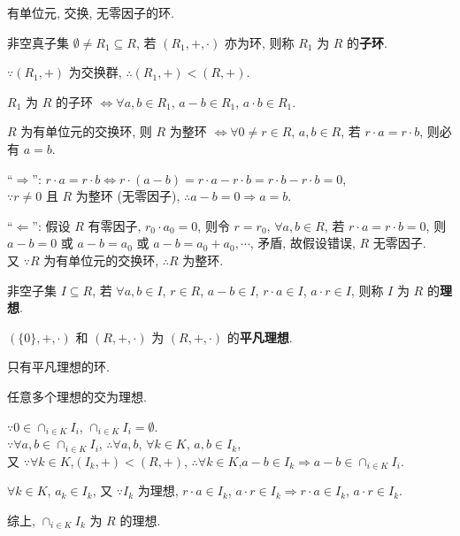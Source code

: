 \documentclass{note}
\begin{document}
\begin{df}[整环]
    有单位元, 交换, 无零因子的环.
\end{df}

\begin{df}[子环]
    非空真子集 $\emptyset\neq R_1\subseteq R$, 若 $(R_1,+,\cdot)$ 亦为环, 则称 $R_1$ 为 $R$ 的\textbf{子环}.
\end{df}

$\because(R_1,+)$ 为交换群, $\therefore(R_1,+)<(R,+)$.

\begin{thm}[子环的判定]
    $R_1$ 为 $R$ 的子环 $\Longleftrightarrow\forall a,b\in R_1$, $a-b\in R_1$, $a\cdot b\in R_1$.
\end{thm}

\begin{thm}
    $R$ 为有单位元的交换环, 则 $R$ 为整环 $\Longleftrightarrow\forall 0\neq r\in R$, $a,b\in R$, 若 $r\cdot a=r\cdot b$, 则必有 $a=b$.
\end{thm}
\begin{pf}
    ``$\Longrightarrow$'': $r\cdot a=r\cdot b\Longleftrightarrow r\cdot(a-b)=r\cdot a-r\cdot b=r\cdot b-r\cdot b=0$,\\
    $\because r\neq 0$ 且 $R$ 为整环 (无零因子), $\therefore a-b=0\Longrightarrow a=b$.

    ``$\Longleftarrow$'': 假设 $R$ 有零因子, $r_0\cdot a_0=0$, 则令 $r=r_0$, $\forall a,b\in R$, 若 $r\cdot a=r\cdot b=0$, 则 $a-b=0$ 或 $a-b=a_0$ 或 $a-b=a_0+a_0,\cdots$, 矛盾, 故假设错误, $R$ 无零因子.\\
    又 $\because R$ 为有单位元的交换环, $\therefore R$ 为整环.
\end{pf}

\begin{df}[理想]
    非空子集 $I\subseteq R$, 若 $\forall a,b\in I$, $r\in R$, $a-b\in I$, $r\cdot a\in I$, $a\cdot r\in I$, 则称 $I$ 为 $R$ 的\textbf{理想}.
\end{df}

\begin{df}[平凡理想]
    $(\{0\},+,\cdot)$ 和 $(R,+,\cdot)$ 为 $(R,+,\cdot)$ 的\textbf{平凡理想}.
\end{df}

\begin{df}[单环]
    只有平凡理想的环.
\end{df}

\begin{thm}
    任意多个理想的交为理想.
\end{thm}
\begin{pf}
    $\because 0\in\cap_{i\in K}I_i$, $\cap_{i\in K}I_i=\emptyset$.\\
    $\because\forall a,b\in\cap_{i\in K}I_i$, $\therefore\forall a,b$, $\forall k\in K$, $a,b\in I_k$,\\
    又 $\because\forall k\in K$,$(I_k,+)<(R,+)$, $\therefore\forall k\in K$,$a-b\in I_k\Longrightarrow a-b\in\cap_{i\in K}I_i$.

    $\forall k\in K$, $a_k\in I_k$, 又 $\because I_k$ 为理想, $r\cdot a\in I_k$, $a\cdot r\in I_k\Longrightarrow r\cdot a\in I_k$, $a\cdot r\in I_k$.

    综上, $\cap_{i\in K}I_k$ 为 $R$ 的理想.
\end{pf}
\end{document}
